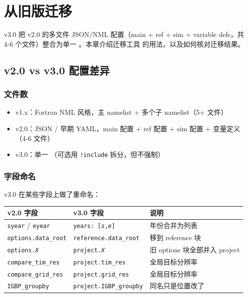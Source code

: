 
\chapter{从旧版迁移}

\openbench{} v3.0 把 v2.0 的多文件 JSON/NML 配置（main + ref + sim + variable defs，共 4-6 个文件）整合为单一 。本章介绍迁移工具  的用法，以及如何核对迁移结果。

\section{v2.0 vs v3.0 配置差异}

\subsection{文件数}

\begin{itemize}
  \item v1.x：Fortran NML 风格，主 namelist + 多个子 namelist（5+ 文件）
  \item v2.0：JSON / 早期 YAML，main 配置 + ref 配置 + sim 配置 + 变量定义（4-6 文件）
  \item v3.0：单一 （可选用 \texttt{!include} 拆分，但不强制）
\end{itemize}

\subsection{字段命名}

v3.0 在某些字段上做了重命名：

\begin{longtable}{l l l}
  \toprule
  v2.0 字段 & v3.0 字段 & 说明 \\
  \midrule
  \endhead
  \texttt{syear} / \texttt{eyear} & \texttt{years: [\textit{s},\textit{e}]} & 年份合并为列表 \\
  \texttt{options.data\_root} & \texttt{reference.data\_root} & 移到 reference 块 \\
  \texttt{options.\textit{X}} & \texttt{project.\textit{X}} & 旧 options 块全部并入 project \\
  \texttt{compare\_tim\_res} & \texttt{project.tim\_res} & 全局目标分辨率 \\
  \texttt{compare\_grid\_res} & \texttt{project.grid\_res} & 全局目标分辨率 \\
  \texttt{IGBP\_groupby} & \texttt{project.IGBP\_groupby} & 同名只是位置改了 \\
  \bottomrule
\end{longtable}

